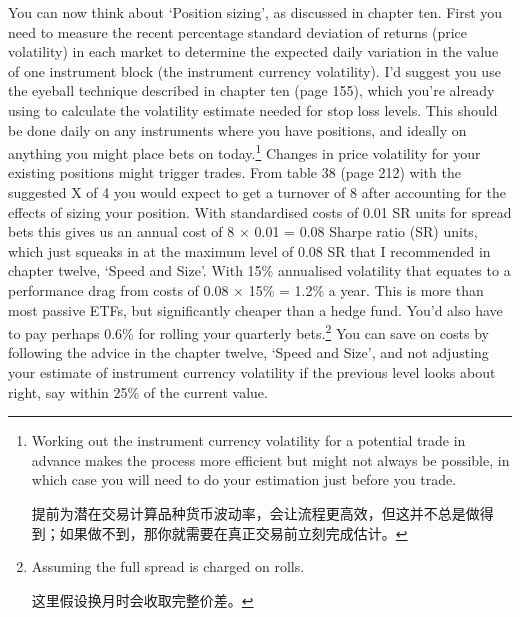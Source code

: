 \begin{englishblock} You can now think about ‘Position sizing', as discussed in chapter ten. First you need to measure the recent percentage standard deviation of returns (price volatility) in each market to determine the expected daily variation in the value of one instrument block (the instrument currency volatility). I'd suggest you use the eyeball technique described in chapter ten (page 155), which you're already using to calculate the volatility estimate needed for stop loss levels. This should be done daily on any instruments where you have positions, and ideally on anything you might place bets on today.\footnote{Working out the instrument currency volatility for a potential trade in advance makes the process more efficient but might not always be possible, in which case you will need to do your estimation just before you trade. \par 提前为潜在交易计算品种货币波动率，会让流程更高效，但这并不总是做得到；如果做不到，那你就需要在真正交易前立刻完成估计。} Changes in price volatility for your existing positions might trigger trades. From table 38 (page 212) with the suggested X of 4 you would expect to get a turnover of 8 after accounting for the effects of sizing your position. With standardised costs of 0.01 SR units for spread bets this gives us an annual cost of 8 × 0.01 = 0.08 Sharpe ratio (SR) units, which just squeaks in at the maximum level of 0.08 SR that I recommended in chapter twelve, ‘Speed and Size'. With 15\% annualised volatility that equates to a performance drag from costs of 0.08 × 15\% = 1.2\% a year. This is more than most passive ETFs, but significantly cheaper than a hedge fund. You'd also have to pay perhaps 0.6\% for rolling your quarterly bets.\footnote{Assuming the full spread is charged on rolls. \par 这里假设换月时会收取完整价差。} You can save on costs by following the advice in the chapter twelve, ‘Speed and Size', and not adjusting your estimate of instrument currency volatility if the previous level looks about right, say within 25\% of the current value. \end{englishblock}

